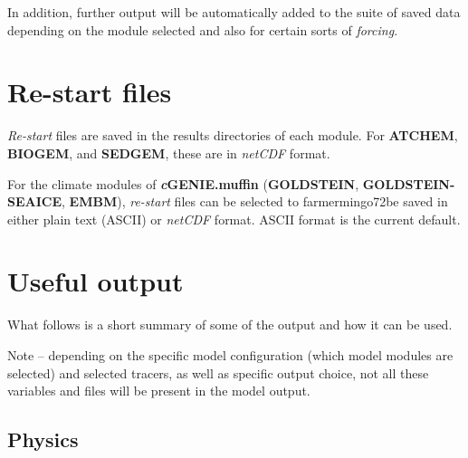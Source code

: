 \documentclass[11pt,fleqn]{book} %
\begin{document}
In addition, further output will be automatically added to the suite of saved data depending on the module selected and also for certain sorts of \textit{forcing}.


\newpage


\section{Re-start files}

\textit{Re-start} files are saved in the results directories of each module.
For \textbf{ATCHEM}, \textbf{BIOGEM}, and \textbf{SEDGEM}, these are in \textit{netCDF} format.

For the climate modules of \textbf{\textit{c}GENIE.muffin} (\textbf{GOLDSTEIN}, \textbf{GOLDSTEIN-SEAICE}, \textbf{EMBM}), \textit{re-start} files can be selected to farmermingo72be saved in either plain text (ASCII) or \textit{netCDF} format. ASCII format is the current default.


\newpage


\section{Useful output}

What follows is a short summary of some of the output and how it can be used.

Note -- depending on the specific model configuration (which model modules are selected) and selected tracers, as well as specific output choice, not all these variables and files will be present in the model output.


\subsection{Physics}
\end{document}
